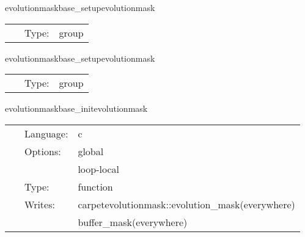 \hspace{5mm} evolutionmaskbase\_setupevolutionmask 

\hspace{5mm}{\it set up the mask function } 


\hspace{5mm}

 \begin{tabular*}{160mm}{cll} 
~ & Type:  & group \\ 
\end{tabular*} 


\vspace{5mm}


\hspace{5mm} evolutionmaskbase\_setupevolutionmask 

\hspace{5mm}{\it set up the mask function } 


\hspace{5mm}

 \begin{tabular*}{160mm}{cll} 
~ & Type:  & group \\ 
\end{tabular*} 


\vspace{5mm}


\hspace{5mm} evolutionmaskbase\_initevolutionmask 

\hspace{5mm}{\it initialise the mask function } 


\hspace{5mm}

 \begin{tabular*}{160mm}{cll} 
~ & Language:  & c \\ 
~ & Options:  & global \\ 
~& ~ &loop-local\\ 
~ & Type:  & function \\ 
~ & Writes:  & carpetevolutionmask::evolution\_mask(everywhere) \\ 
~& ~ &buffer\_mask(everywhere)\\ 
\end{tabular*} 


\vspace{5mm}


